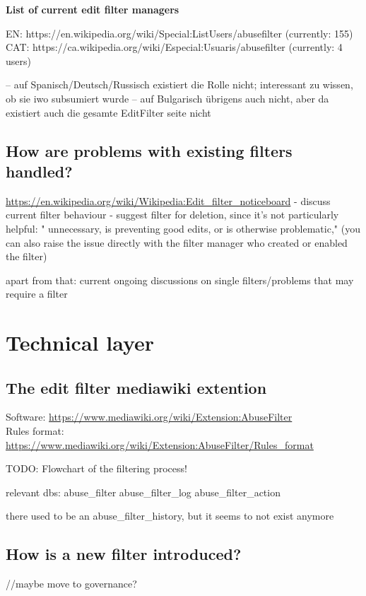 \documentclass{sigchi}
\begin{document}
\textbf{List of current edit filter managers}

EN: https://en.wikipedia.org/wiki/Special:ListUsers/abusefilter (currently: 155)
CAT: https://ca.wikipedia.org/wiki/Especial:Usuaris/abusefilter (currently: 4 users)

-- auf Spanisch/Deutsch/Russisch existiert die Rolle nicht; interessant zu wissen, ob sie iwo subsumiert wurde
-- auf Bulgarisch übrigens auch nicht, aber da existiert auch die gesamte EditFilter seite nicht

\subsection{How are problems with existing filters handled?}

\url{https://en.wikipedia.org/wiki/Wikipedia:Edit_filter_noticeboard}
- discuss current filter behaviour
- suggest filter for deletion, since it's not particularly helpful: " unnecessary, is preventing good edits, or is otherwise problematic,"
  (you can also raise the issue directly with the filter manager who created or enabled the filter)

apart from that: current ongoing discussions on single filters/problems that may require a filter

\section{Technical layer}

\subsection{The edit filter mediawiki extention}

Software: \url{https://www.mediawiki.org/wiki/Extension:AbuseFilter}\\
Rules format: \url{https://www.mediawiki.org/wiki/Extension:AbuseFilter/Rules_format}

TODO: Flowchart of the filtering process!

relevant dbs:
abuse\_filter
abuse\_filter\_log
abuse\_filter\_action

there used to be an abuse\_filter\_history, but it seems to not exist anymore

\subsection{How is a new filter introduced?}
//maybe move to governance?
\end{document}
